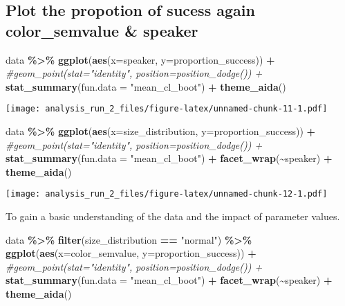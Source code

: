 \documentclass[
]{article}
\newenvironment{Shaded}{\begin{snugshade}}{\end{snugshade}}
\newcommand{\AttributeTok}[1]{\textcolor[rgb]{0.13,0.29,0.53}{#1}}
\newcommand{\CommentTok}[1]{\textcolor[rgb]{0.56,0.35,0.01}{\textit{#1}}}
\newcommand{\FunctionTok}[1]{\textcolor[rgb]{0.13,0.29,0.53}{\textbf{#1}}}
\newcommand{\NormalTok}[1]{#1}
\newcommand{\SpecialCharTok}[1]{\textcolor[rgb]{0.81,0.36,0.00}{\textbf{#1}}}
\newcommand{\StringTok}[1]{\textcolor[rgb]{0.31,0.60,0.02}{#1}}
\begin{document}
\hypertarget{plot-the-propotion-of-sucess-again-color_semvalue-speaker}{%
\subsection{Plot the propotion of sucess again color\_semvalue \&
speaker}\label{plot-the-propotion-of-sucess-again-color_semvalue-speaker}}

\begin{Shaded}
\begin{Highlighting}[]
\NormalTok{data }\SpecialCharTok{\%\textgreater{}\%} 
  \FunctionTok{ggplot}\NormalTok{(}\FunctionTok{aes}\NormalTok{(}\AttributeTok{x=}\NormalTok{speaker, }\AttributeTok{y=}\NormalTok{proportion\_success)) }\SpecialCharTok{+} 
  \CommentTok{\#geom\_point(stat="identity", position=position\_dodge()) + }
  \FunctionTok{stat\_summary}\NormalTok{(}\AttributeTok{fun.data =} \StringTok{"mean\_cl\_boot"}\NormalTok{) }\SpecialCharTok{+}
  \FunctionTok{theme\_aida}\NormalTok{()}
\end{Highlighting}
\end{Shaded}

\texttt{[image: analysis\_run\_2\_files/figure-latex/unnamed-chunk-11-1.pdf]}

\begin{Shaded}
\begin{Highlighting}[]
\NormalTok{data }\SpecialCharTok{\%\textgreater{}\%}
  \FunctionTok{ggplot}\NormalTok{(}\FunctionTok{aes}\NormalTok{(}\AttributeTok{x=}\NormalTok{size\_distribution, }\AttributeTok{y=}\NormalTok{proportion\_success)) }\SpecialCharTok{+} 
  \CommentTok{\#geom\_point(stat="identity", position=position\_dodge()) + }
  \FunctionTok{stat\_summary}\NormalTok{(}\AttributeTok{fun.data =} \StringTok{"mean\_cl\_boot"}\NormalTok{) }\SpecialCharTok{+}
  \FunctionTok{facet\_wrap}\NormalTok{(}\SpecialCharTok{\textasciitilde{}}\NormalTok{speaker) }\SpecialCharTok{+} 
  \FunctionTok{theme\_aida}\NormalTok{()}
\end{Highlighting}
\end{Shaded}

\texttt{[image: analysis\_run\_2\_files/figure-latex/unnamed-chunk-12-1.pdf]}

To gain a basic understanding of the data and the impact of parameter
values.

\begin{Shaded}
\begin{Highlighting}[]
\NormalTok{data }\SpecialCharTok{\%\textgreater{}\%} \FunctionTok{filter}\NormalTok{(size\_distribution }\SpecialCharTok{==} \StringTok{"normal"}\NormalTok{) }\SpecialCharTok{\%\textgreater{}\%}
  \FunctionTok{ggplot}\NormalTok{(}\FunctionTok{aes}\NormalTok{(}\AttributeTok{x=}\NormalTok{color\_semvalue, }\AttributeTok{y=}\NormalTok{proportion\_success)) }\SpecialCharTok{+} 
  \CommentTok{\#geom\_point(stat="identity", position=position\_dodge()) + }
  \FunctionTok{stat\_summary}\NormalTok{(}\AttributeTok{fun.data =} \StringTok{"mean\_cl\_boot"}\NormalTok{) }\SpecialCharTok{+}
  \FunctionTok{facet\_wrap}\NormalTok{(}\SpecialCharTok{\textasciitilde{}}\NormalTok{speaker) }\SpecialCharTok{+} 
  \FunctionTok{theme\_aida}\NormalTok{()}
\end{Highlighting}
\end{Shaded}
\end{document}
